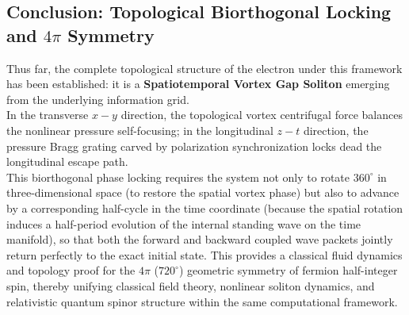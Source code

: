 \documentclass[12pt, a4paper]{article}
\begin{document}
\subsection{Conclusion: Topological Biorthogonal Locking and $4\pi$ Symmetry}

Thus far, the complete topological structure of the electron under this framework has been established: it is a \textbf{Spatiotemporal Vortex Gap Soliton} emerging from the underlying information grid.\\
In the transverse $x-y$ direction, the topological vortex centrifugal force balances the nonlinear pressure self-focusing; in the longitudinal $z-t$ direction, the pressure Bragg grating carved by polarization synchronization locks dead the longitudinal escape path.\\
This biorthogonal phase locking requires the system not only to rotate $360^\circ$ in three-dimensional space (to restore the spatial vortex phase) but also to advance by a corresponding half-cycle in the time coordinate (because the spatial rotation induces a half-period evolution of the internal standing wave on the time manifold), so that both the forward and backward coupled wave packets jointly return perfectly to the exact initial state. This provides a classical fluid dynamics and topology proof for the $4\pi$ ($720^\circ$) geometric symmetry of fermion half-integer spin, thereby unifying classical field theory, nonlinear soliton dynamics, and relativistic quantum spinor structure within the same computational framework.
\end{document}
